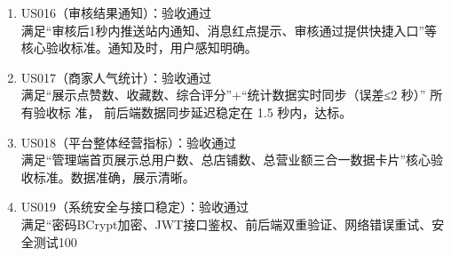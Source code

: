 \begin{levellist}
\begin{itemize}
\begin{enumerate}
                  \item US016（审核结果通知）：验收通过 \\
                        满足“审核后1秒内推送站内通知、消息红点提示、审核通过提供快捷入口”等核心验收标准。通知及时，用户感知明确。
                  \item US017（商家人气统计）：验收通过 \\
                        满足“展示点赞数、收藏数、综合评分”+“统计数据实时同步（误差≤2 秒）” 所有验收标		准，	前后端数据同步延迟稳定在 1.5 秒内，达标。
                  \item US018（平台整体经营指标）：验收通过 \\
                        满足“管理端首页展示总用户数、总店铺数、总营业额三合一数据卡片”核心验收标准。数据准确，展示清晰。
                  \item US019（系统安全与接口稳定）：验收通过 \\
                        满足“密码BCrypt加密、JWT接口鉴权、前后端双重验证、网络错误重试、安全测试100%

              \end{enumerate}
    \end{itemize}


\end{levellist}
